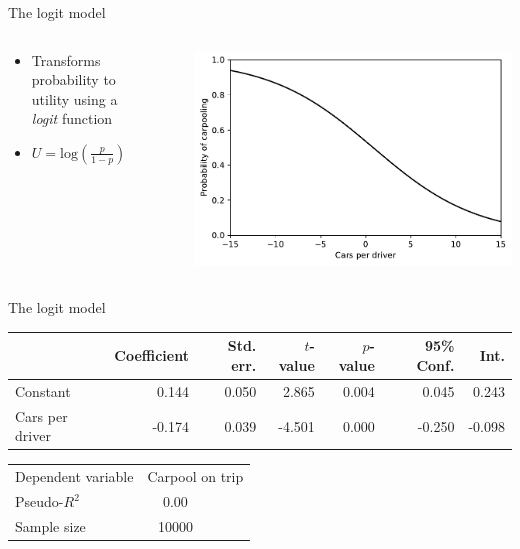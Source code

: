 \begin{frame}{The logit model}
  \begin{columns}
    \begin{column}{0.65\textwidth}
      \begin{itemize}
        \item Transforms probability to utility using a \emph{logit} function
        \item $U = \mathrm{log}(\frac{p}{1 - p})$
      \end{itemize}
    \end{column}~%
    \begin{column}{0.34\textwidth}
      \includegraphics[width=\textwidth]{fig/logit.pdf}
    \end{column}
  \end{columns}
\end{frame}

\begin{frame}{The logit model}
  \centering\begin{tabular}{lrrrrrr}
  \toprule
  {} &  Coefficient &  Std. err. &  $t$-value &  $p$-value &  95\% Conf. &   Int. \\
  \midrule
  Constant        &        0.144 &      0.050 &      2.865 &      0.004 &      0.045 &  0.243 \\
  Cars per driver &       -0.174 &      0.039 &     -4.501 &      0.000 &     -0.250 & -0.098 \\
  \bottomrule
  \end{tabular}
  \begin{tabular}{lclc}
  Dependent variable & \multicolumn{3}{l}{Carpool on trip} \\
  Pseudo-$R^2$ & 0.00 & \\
  Sample size & 10000 && \\
  \end{tabular}\\
  \tiny\citenhts
\end{frame}

